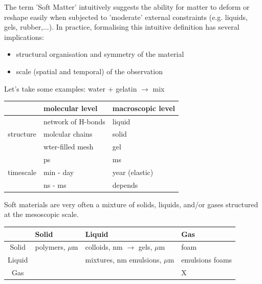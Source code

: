 \documentclass[a4paper, 11pt, normalem]{report}
\begin{document}
The term 'Soft Matter' intuitively suggests the ability for matter to deform or reshape easily when subjected to 'moderate' external constraints (e.g. liquids, gels, rubber,...).
In practice, formalising this intuitive definition has several implications:
\begin{itemize}
    \item structural organisation and symmetry of the material
    \item scale (spatial and temporal) of the observation
\end{itemize}
Let's take some examples: {\color{blue}water} + {\color{red}gelatin} $\to$ {\color{green}mix}
\begin{table}[H]
    \centering
    \begin{tabular}{c|l|l}
        & molecular level & macroscopic level \\
        \hline
        \multirow{3}{*}{structure} & {\color{blue} network of H-bonds} & {\color{blue}liquid} \\
                                   & {\color{red} molcular chains} & {\color{red} solid} \\
                                   & {\color{green} wter-filled mesh} & {\color{green} gel} \\
        \hline
        \multirow{3}{*}{timescale} & {\color{blue} ps} & {\color{blue} ms} \\
                                   & {\color{red} min - day} & {\color{red} year (elastic)} \\
                                   & {\color{green} ns - ms} & {\color{green} depends}
    \end{tabular}
\end{table}
Soft materials are very often a mixture of solids, liquids, and/or gases structured at the mesoscopic scale.
\begin{table}[H]
    \centering
    \begin{tabular}{c|p{2.5cm}|p{2.5cm}|p{2.5cm}}
        & Solid & Liquid & Gas \\
        \hline
        Solid & polymers, $\mu$m & colloids, nm $\to$ \newline gels, $\mu$m & foam \\
        \hline
        Liquid & & mixtures, nm  \newline emulsions, $\mu$m & emulsions \newline foams \\
        \hline
        Gas & & & {\large X}
    \end{tabular}
\end{table}
\end{document}
